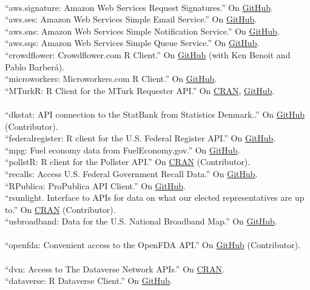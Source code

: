 \documentclass[12pt]{article}
\newcommand{\topic}[1]{\pagebreak[3]\indent {\color{lg}{\footnotesize #1 }}\\}
\newcommand{\entry}[1]{\indent {\color{lg}\guillemotright}\hspace{2pt}#1\vspace{.25em}\\}
\begin{document}
\topic{R packages contributed to the cloudyr project}
\entry{``aws.signature: Amazon Web Services Request Signatures.'' On \href{https://github.com/cloudyr/aws.signature}{GitHub}.}
\entry{``aws.ses: Amazon Web Services Simple Email Service.'' On \href{https://github.com/cloudyr/aws.ses}{GitHub}.}
\entry{``aws.sns: Amazon Web Services Simple Notification Service.'' On \href{https://github.com/cloudyr/aws.sns}{GitHub}.}
\entry{``aws.sqs: Amazon Web Services Simple Queue Service.'' On \href{https://github.com/cloudyr/aws.sqs}{GitHub}.}
\entry{``crowdflower: Crowdflower.com R Client.'' On \href{https://github.com/cloudyr/crowdflower}{GitHub} (with Ken Benoit and Pablo Barber\'{a}).}
\entry{``microworkers: Microworkers.com R Client.'' On \href{https://github.com/leeper/microworkers}{GitHub}.}
\entry{``MTurkR: R Client for the MTurk Requester API.'' On \href{https://cran.r-project.org/package=MTurkR}{CRAN}, \href{https://github.com/leeper/MTurkR}{GitHub}.}

\topic{R packages contributed to the rOpenGov project}
\entry{``dkstat: API connection to the StatBank from Statistics Denmark..'' On \href{https://github.com/rOpenGov/dkstat}{GitHub} (Contributor).}
\entry{``federalregister: R client for the U.S. Federal Register API.'' On \href{https://github.com/rOpenGov/federalregister}{GitHub}.}
\entry{``mpg: Fuel economy data from FuelEconomy.gov.'' On \href{https://github.com/rOpenGov/mpg}{GitHub}.}
\entry{``pollstR: R client for the Pollster API.'' On \href{https://cran.r-project.org/package=pollstR}{CRAN} (Contributor).}
\entry{``recalls: Access U.S. Federal Government Recall Data.'' On \href{https://github.com/rOpenGov/recalls}{GitHub}.}
\entry{``RPublica: ProPublica API Client.'' On \href{https://github.com/rOpenGov/RPublica}{GitHub}.}
\entry{``rsunlight. Interface to APIs for data on what our elected representatives are up to.'' On \href{https://cran.r-project.org/package=rsunlight}{CRAN} (Contributor).}
\entry{``usbroadband: Data for the U.S. National Broadband Map.'' On \href{https://github.com/rOpenGov/usbroadband}{GitHub}.}

\topic{R packages contributed to the rOpenHealth project}
\entry{``openfda: Convenient access to the OpenFDA API.'' On \href{https://github.com/ropenhealth/openfda}{GitHub} (Contributor).}

\topic{R packages contributed to the rOpenSci project}
\entry{``dvn: Access to The Dataverse Network APIs.'' On \href{https://cran.r-project.org/package=dvn}{CRAN}.}
\entry{``dataverse: R Dataverse Client.'' On \href{https://github.com/iqss/dataverse-client-r}{GitHub}.}
\end{document}
